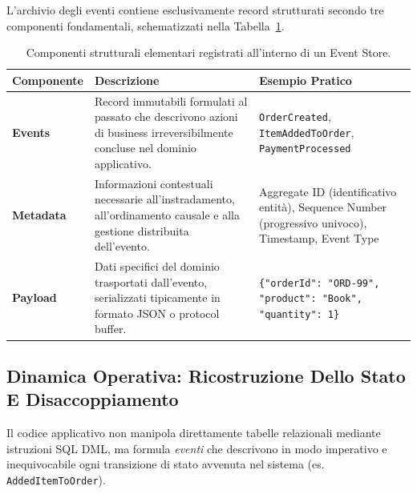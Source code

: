 \documentclass[11pt, a4paper]{article}
\begin{document}
L'archivio degli eventi contiene esclusivamente record strutturati secondo tre componenti fondamentali, schematizzati nella Tabella~\ref{tab:event_store_components}.

\begin{table}[H]
\centering
\small
\caption{Componenti strutturali elementari registrati all'interno di un Event Store.}
\label{tab:event_store_components}
\begin{tabularx}{\textwidth}{l p{5cm} X}
\toprule
\textbf{Componente} & \textbf{Descrizione} & \textbf{Esempio Pratico} \\
\midrule
\textbf{Events} & Record immutabili formulati al passato che descrivono azioni di business irreversibilmente concluse nel dominio applicativo. & \texttt{OrderCreated}, \texttt{ItemAddedToOrder}, \texttt{PaymentProcessed} \\
\addlinespace
\textbf{Metadata} & Informazioni contestuali necessarie all'instradamento, all'ordinamento causale e alla gestione distribuita dell'evento. & Aggregate ID (identificativo entità), Sequence Number (progressivo univoco), Timestamp, Event Type \\
\addlinespace
\textbf{Payload} & Dati specifici del dominio trasportati dall'evento, serializzati tipicamente in formato JSON o protocol buffer. & \texttt{\{"orderId": "ORD-99", "product": "Book", "quantity": 1\}} \\
\bottomrule
\end{tabularx}
\end{table}

\subsection{Dinamica Operativa: Ricostruzione Dello Stato E Disaccoppiamento}

Il codice applicativo non manipola direttamente tabelle relazionali mediante istruzioni SQL DML, ma formula \emph{eventi} che descrivono in modo imperativo e inequivocabile ogni transizione di stato avvenuta nel sistema (es. \texttt{AddedItemToOrder}).

\end{document}
